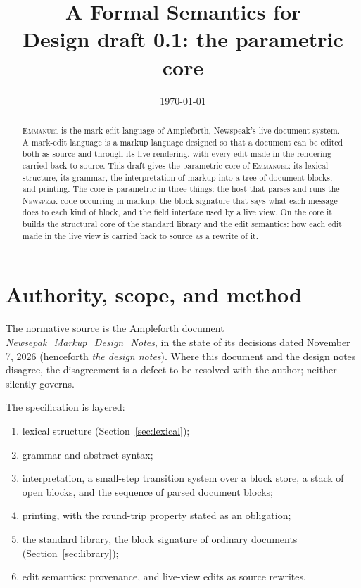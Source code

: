 \documentclass[11pt]{article}
\title{A Formal Semantics for \EM\\\large Design draft 0.1: the parametric core}
\author{}
\date{\today}
\numberwithin{equation}{section}
\newcommand{\EM}{\textsc{Emmanuel}}
\newcommand{\NS}{\textsc{Newspeak}}
\begin{document}
\maketitle

\begin{abstract}
\EM{} is the mark-edit language of Ampleforth, Newspeak's live document
system.  A mark-edit language is a markup language designed so that a
document can be edited both as source and through its live rendering, with
every edit made in the rendering carried back to source.  This draft gives
the parametric core of \EM: its lexical structure, its grammar, the
interpretation of markup into a tree of document blocks, and printing.  The
core is parametric in three things: the host that parses and runs the
\NS{} code occurring in markup, the block signature that says what
each message does to each kind of block, and the field interface used by
a live view.  On the core it builds the structural core of the standard
library and the edit semantics: how each edit made in the live view is
carried back to source as a rewrite of it.
\end{abstract}

\clearpage
\begingroup
\footnotesize
\tableofcontents
\endgroup
\clearpage

\section{Authority, scope, and method}
\label{sec:method}

The normative source is the Ampleforth document
\emph{Newsepak\_Markup\_Design\_Notes}, in the state of its decisions dated
November 7, 2026 (henceforth \emph{the design notes}).  Where this document
and the design notes disagree, the disagreement is a defect to be resolved
with the author; neither silently governs.

The specification is layered:
\begin{enumerate}
\item lexical structure (Section~\ref{sec:lexical});
\item grammar and abstract syntax;
\item interpretation, a small-step transition system over a block store,
      a stack of open blocks, and the sequence of parsed document blocks;
\item printing, with the round-trip property stated as an obligation;
\item the standard library, the block signature of ordinary documents
      (Section~\ref{sec:library});
\item edit semantics: provenance, and live-view edits as
      source rewrites.
\end{enumerate}
\end{document}
